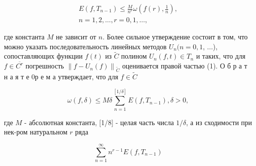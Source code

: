 \documentclass[10pt]{article}
\begin{document}
\[

\begin{gathered}

E\left(f, T_{n-1}\right) \leqslant \frac{M}{n^{r}} \omega\left(f(r), \frac{1}{n}\right), \\

n=1,2, \ldots, r=0,1, \ldots,

\end{gathered}

\]



где константа $M$ не зависит от $n$. Более сильное утверждение состоит в том, что можно указать последовательность линейных методов $U_{n}(n=0,1$, ...), сопоставляющих функции $f(t)$ из $\tilde{C}$ полином $U_{n}(f, t) \in T_{n}$ и таких, что для $f \in \overline{C^{r}}$ погрешность $\left\|f-U_{n}(f)\right\|_{\tilde{C}}$ оценивается правой частью (1). О б р а т н а я т е 0р е м а утверждает, что для $f \in \tilde{C}$



\[

\omega(f, \delta) \leqslant M \delta \sum_{n=1}^{[1 / \delta]} E\left(f, T_{n-1}\right), \delta>0,

\]



где $M$ - абсолютная константа, [1/8] - целая часть числа $1 / \delta$, а из сходимости при нек-ром натуральном $r$ ряда



\[

\sum_{n=1}^{\infty} n^{r-1} E\left(f, T_{n-1}\right)

\]
\end{document}
